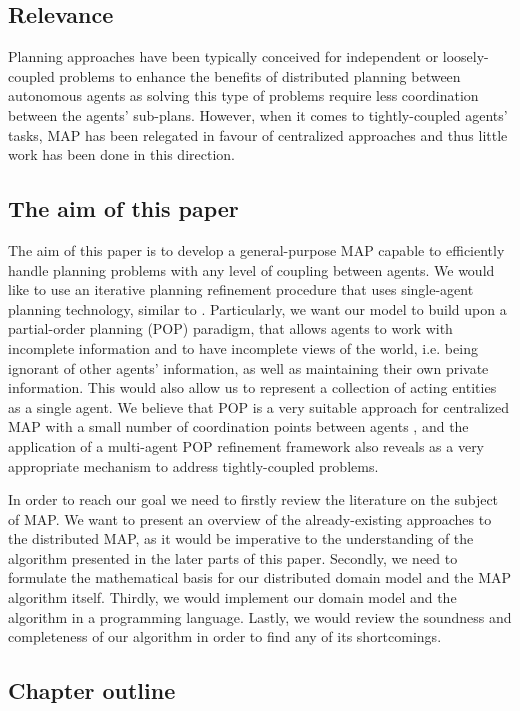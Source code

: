 \documentclass[12pt]{article}
\begin{document}
\subsection{Relevance}

Planning approaches have been typically conceived for independent or loosely-coupled problems to enhance the benefits of distributed planning between autonomous agents as solving this type of problems require less coordination between the agents' sub-plans.
However, when it comes to tightly-coupled agents' tasks, MAP has been relegated in favour of centralized approaches and thus little work has been done in this direction.

\subsection{The aim of this paper}

The aim of this paper is to develop a general-purpose MAP capable to efficiently handle planning problems with any level of coupling between agents.
We would like to use an iterative planning refinement procedure that uses single-agent planning technology, similar to \cite{Jonsson2011ScalingUM}.
Particularly, we want our model to build upon a partial-order planning (POP) paradigm, that allows agents to work with incomplete information and to have incomplete views of the world, i.e.
being ignorant of other agents' information, as well as maintaining their own private information.
This would also allow us to represent a collection of acting entities as a single agent.
We believe that POP is a very suitable approach for centralized MAP with a small number of coordination points between agents \cite{Kvarnstrm2010PlanningFL}, and the application of a multi-agent POP refinement framework also reveals as a very appropriate mechanism to address tightly-coupled problems.

In order to reach our goal we need to firstly review the literature on the subject of MAP. We want to present an overview of the already-existing approaches to the distributed MAP, as it would be imperative to the understanding of the algorithm presented in the later parts of this paper.
Secondly, we need to formulate the mathematical basis for our distributed domain model and the MAP algorithm itself.
Thirdly, we would implement our domain model and the algorithm in a programming language.
Lastly, we would review the soundness and completeness of our algorithm in order to find any of its shortcomings.

\subsection{Chapter outline}
\end{document}
